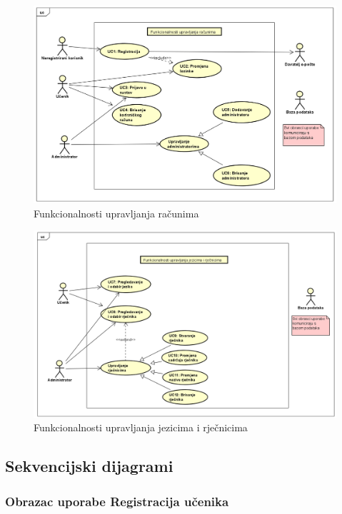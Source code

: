 \begin{figure}[H]
	\includegraphics[scale=0.6]{dijagrami/upravljanje_Racunima.png} 
	\centering
	\caption{Funkcionalnosti upravljanja računima}
	\label{fig:dijagram2}
\end{figure}

\begin{figure}[H]
	\includegraphics[scale=0.6]{dijagrami/upravljanje_rjecnicima.png} 
	\centering
	\caption{Funkcionalnosti upravljanja jezicima i rječnicima}
	\label{fig:dijagram3}
\end{figure}	

\subsection{Sekvencijski dijagrami}

\subsubsection{{Obrazac uporabe Registracija učenika}}


